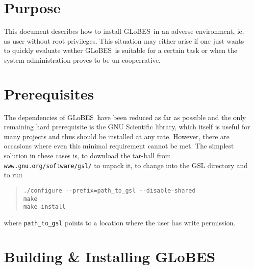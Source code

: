 \documentclass{article}
\newcommand{\glb}{{\sf GLoBES}}
\begin{document}
\section{Purpose}
This document describes how to install \glb\ in an adverse
environment, ie. as user without root privileges. This 
situation may either arise if one just wants to quickly 
evaluate wether \glb\ is suitable for a certain task or
when the system administration proves to be un-cooperrative.

\section{Prerequisites}

The dependencies of \glb\ have been reduced as far as 
possible and the only remaining hard prerequisite is the
GNU Scientific library, which itself is useful for many
projects and thus should be installed at any rate. However,
there are occasions where even this minimal requirement 
cannot be met. The simplest solution in these cases is, to
download the tar-ball from {\tt www.gnu.org/software/gsl/}
to unpack it, to change into the GSL directory and to run
\begin{quote}
\begin{verbatim}
./configure --prefix=path_to_gsl --disable-shared
make
make install
\end{verbatim}
\end{quote}
where \verb^path_to_gsl^ points to a location where the user
has write permission.

\section{Building \& Installing \glb}
\end{document}
